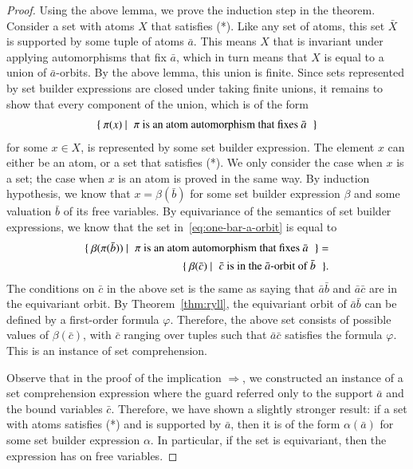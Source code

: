 \begin{proof}
	Using the above lemma, we prove  the induction step in the theorem.  Consider  a set with atoms $X$ that satisfies (*). Like any set of atoms, this set $\bar X$ is supported by some tuple of atoms $\bar a$.  This  means $X$ that is invariant under applying automorphisms that fix $\bar a$, which in turn means  that $X$ is equal to a union of $\bar a$-orbits. By the above lemma, this union is finite. 
	Since sets represented by set builder expressions are closed under taking finite unions, it remains to show that every component of the union, which is of the form 
		\begin{align}
		\label{eq:one-bar-a-orbit}
		 \setbuild { \pi(x)}{$\pi$ is an atom automorphism that fixes $\bar a$}
		\end{align}
		for some $x \in X$, is represented by some set builder expression.  The element $x$ can either be an atom, or a set that satisfies (*).  We only consider the case when $x$ is a set; the case when $x$ is an atom is proved in the same way. By induction hypothesis, we know that $x =\beta(\bar  b)$ for some set builder expression $\beta$ and some valuation $\bar b$ of its free variables. By equivariance of the semantics of set builder expressions, we know that the set in~\eqref{eq:one-bar-a-orbit} is equal to 
		\begin{align*}
		\setbuild { \beta(\pi(\bar b)) }{$\pi$ is an atom automorphism that fixes $\bar a$} = \\
		\setbuild { \beta(\bar c) }{$\bar c$ is in the $\bar a$-orbit of $\bar b$}.
		\end{align*}
		The conditions on $\bar c$ in the above set is the same as saying that $\bar a \bar b$ and $\bar a \bar c$ are in the equivariant orbit.  By Theorem~\ref{thm:ryll}, the equivariant orbit of $\bar a \bar b$ can be defined by a first-order formula $\varphi$. Therefore, the above set consists of possible values of $\beta(\bar c)$, with $\bar c$ ranging over tuples such that $\bar a \bar c$ satisfies the formula $\varphi$. This is an instance of set comprehension.
		
		Observe that in the proof of the implication $\Rightarrow$, we constructed an instance of a  set comprehension expression where the guard referred only to the support $\bar a$ and the bound variables $\bar c$.   Therefore, we have shown a slightly stronger result: if a set with atoms satisfies (*) and  is  supported by $\bar a$, then it is of the form $\alpha(\bar a)$ for some set builder expression $\alpha$. In particular, if the set is equivariant, then the expression has on free variables.
\end{proof}


